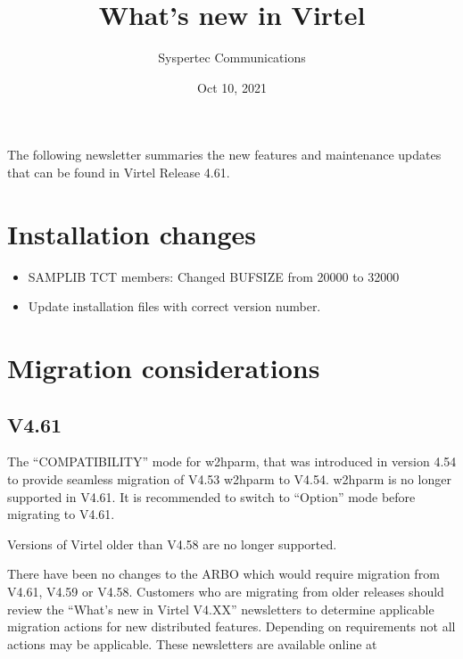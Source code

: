 \documentclass[letterpaper,10pt,english]{sphinxmanual}
\title{What's new in Virtel}
\date{Oct 10, 2021}
\author{Syspertec Communications}
\begin{document}
\pagestyle{empty}
\sphinxmaketitle
\pagestyle{plain}
\sphinxtableofcontents
\pagestyle{normal}
\label{\detokenize{TN202101::doc}}


The following newsletter summaries the new features and maintenance updates that can be found in Virtel Release 4.61.


\chapter{Installation changes}
\label{\detokenize{TN202101:installation-changes}}
\begin{itemize}
\item {} 
SAMPLIB TCT members: Changed BUFSIZE from 20000 to 32000

\end{itemize}

\begin{itemize}
\item {} 
Update installation files with correct version number.

\end{itemize}


\chapter{Migration considerations}
\label{\detokenize{TN202101:migration-considerations}}

\section{V4.61}
\label{\detokenize{TN202101:v4-61}}

The “COMPATIBILITY” mode for w2hparm, that was introduced in version 4.54 to provide seamless migration of V4.53 w2hparm to V4.54. w2hparm is no longer supported in V4.61. It is recommended to switch to “Option” mode before migrating to V4.61.


Versions of Virtel older than V4.58 are no longer supported.


There have been no changes to the ARBO which would require migration from V4.61, V4.59 or V4.58. Customers who are migrating from older releases should review the
“What’s new in Virtel V4.XX” newsletters to determine applicable migration actions for new distributed features.
Depending on requirements not all actions may be applicable. These newsletters are available online at 
\end{document}
